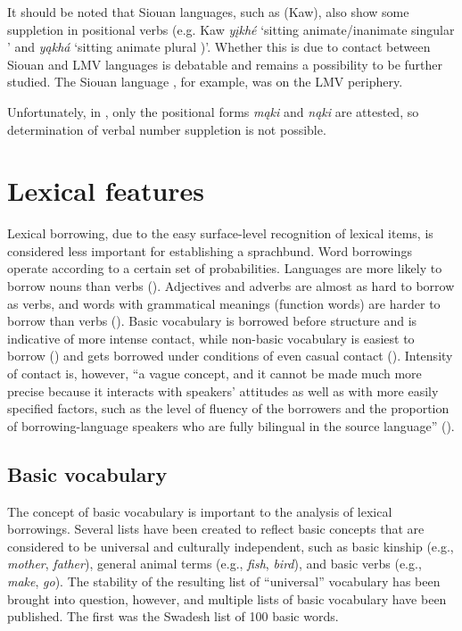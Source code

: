 \documentclass[output=paper]{LSP/langsci}
\begin{document}
	It should be noted that  Siouan languages, such as  (Kaw), also show some suppletion in positional verbs (e.g. Kaw \emph{yįkhé} `sitting animate/inanimate singular ' and \emph{yąkhá} `sitting animate plural )'. Whether this is due to contact between  Siouan and LMV languages is debatable and remains a possibility to be further studied. The  Siouan language , for example, was on the LMV periphery.

Unfortunately, in , only the positional forms \emph{mąki} and \emph{nąki} are attested, so determination of verbal number suppletion is not possible.

\section{Lexical features}

	Lexical borrowing, due to the easy surface-level recognition of lexical items, is considered less important for establishing a sprachbund. Word borrowings operate according to a certain set of probabilities. Languages are more likely to borrow nouns than verbs (\citealt[231]{Tadmoretal2010}). Adjectives and adverbs are almost as hard to borrow as verbs, and words with grammatical meanings (function words) are harder to borrow than verbs (\citealt[231]{Tadmoretal2010}). Basic vocabulary is borrowed before structure and is indicative of more intense contact, while non-basic vocabulary is easiest to borrow (\citealt[69]{Thomason2001}) and gets borrowed under conditions of even casual contact (\citealt[231]{Tadmoretal2010}). Intensity of contact is, however, “a vague concept, and it cannot be made much more precise because it interacts with speakers’ attitudes as well as with more easily specified factors, such as the level of fluency of the borrowers and the proportion of borrowing-language speakers who are fully bilingual in the source language” (\citealt[231]{Tadmoretal2010}). 

\subsection{Basic vocabulary}

	The concept of basic vocabulary is important to the analysis of lexical borrowings. Several lists have been created to reflect basic concepts that are considered to be universal and culturally independent, such as basic kinship (e.g., \emph{mother}, \emph{father}), general animal terms (e.g., \emph{fish}, \emph{bird}), and basic verbs (e.g., \emph{make}, \emph{go}). The stability of the resulting list of “universal” vocabulary has been brought into question, however, and multiple lists of basic vocabulary have been published. The first was the Swadesh list of 100 basic words.
\end{document}

